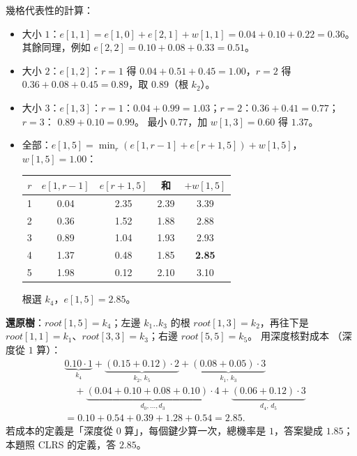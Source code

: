 \begin{pastsoln}
幾格代表性的計算：
\begin{itemize}
\item 大小 $1$：$e[1,1] = e[1,0] + e[2,1] + w[1,1] = 0.04 + 0.10 + 0.22 = 0.36$。 其餘同理，例如
$e[2,2] = 0.10 + 0.08 + 0.33 = 0.51$。
\item 大小 $2$：$e[1,2]$：$r = 1$ 得 $0.04 + 0.51 + 0.45 = 1.00$，$r = 2$ 得 $0.36 + 0.08 + 0.45 = 0.89$，取
$0.89$（根 $k_2$）。
\item 大小 $3$：$e[1,3]$：$r = 1$：$0.04 + 0.99 = 1.03$；$r = 2$：$0.36 + 0.41 = 0.77$；$r = 3$：
$0.89 + 0.10 = 0.99$。 最小 $0.77$，加 $w[1,3] = 0.60$ 得 $1.37$。
\item 全部：$e[1,5] = \min_r (e[1, r-1] + e[r+1, 5]) + w[1,5]$，$w[1,5] = 1.00$：
\begin{center}
\small
\begin{tabular}{ccccc}
\toprule
$r$ & $e[1, r-1]$ & $e[r+1, 5]$ & 和 & $+ w[1,5]$ \\
\midrule
1 & 0.04 & 2.35 & 2.39 & 3.39 \\
2 & 0.36 & 1.52 & 1.88 & 2.88 \\
3 & 0.89 & 1.04 & 1.93 & 2.93 \\
4 & 1.37 & 0.48 & 1.85 & \textbf{2.85} \\
5 & 1.98 & 0.12 & 2.10 & 3.10 \\
\bottomrule
\end{tabular}
\end{center}
根選 $k_4$，$e[1,5] = 2.85$。
\end{itemize}

\textbf{還原樹}：$\mathit{root}[1,5] = k_4$；左邊 $k_1..k_3$ 的根 $\mathit{root}[1,3] = k_2$，再往下是
$\mathit{root}[1,1] = k_1$、$\mathit{root}[3,3] = k_3$；右邊 $\mathit{root}[5,5] = k_5$。 用深度核對成本
（深度從 $1$ 算）：
\begin{align*}
&\underbrace{0.10 \cdot 1}_{k_4} + \underbrace{(0.15 + 0.12) \cdot 2}_{k_2,\,k_5}
+ \underbrace{(0.08 + 0.05) \cdot 3}_{k_1,\,k_3} \\
&\quad + \underbrace{(0.04 + 0.10 + 0.08 + 0.10) \cdot 4}_{d_0, \ldots, d_3}
+ \underbrace{(0.06 + 0.12) \cdot 3}_{d_4,\,d_5} \\
&= 0.10 + 0.54 + 0.39 + 1.28 + 0.54 = 2.85 .
\end{align*}
若成本的定義是「深度從 $0$ 算」，每個鍵少算一次，總機率是 $1$，答案變成 $1.85$；本題照 CLRS 的定義，答
$2.85$。
\end{pastsoln}
